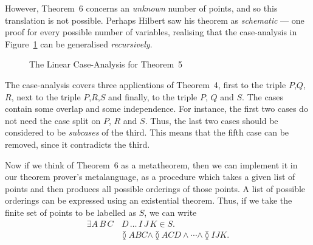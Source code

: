 However, Theorem~6 concerns an \emph{unknown} number of points, and so this translation is not possible. Perhaps Hilbert saw his theorem as \emph{schematic} --- one proof for every possible number of variables, realising that the case-analysis in Figure~\ref{fig:Theorem5Cases} can be generalised \emph{recursively}. 

\begin{figure}
\caption{The Linear Case-Analysis for Theorem~5}
\label{fig:Theorem5Cases}
\end{figure}

The case-analysis covers three applications of Theorem~4, first to the triple $P$,$Q$,$R$, next to the triple $P$,$R$,$S$ and finally, to the triple $P$, $Q$ and $S$. The cases contain some overlap and some independence. For instance, the first two cases do not need the case split on $P$, $R$ and $S$. Thus, the last two cases should be considered to be \emph{subcases} of the third. This means that the fifth case can be removed, since it contradicts the third.\label{sec:IgnoreCase5}

Now if we think of Theorem~6 as a metatheorem, then we can implement it in our theorem prover's metalanguage, as a procedure which takes a given list of points and then produces all possible orderings of those points. A list of possible orderings can be expressed using an existential theorem. Thus, if we take the finite set of points to be labelled as $S$, we can write
\begin{align*}\label{theorem:Theorem6Example}
\exists A\,B\,C&\,D\,\ldots\,I\,J\,K \in S.\tag{$\ddagger$}\\
                &\between{A}{B}{C} \wedge \between{A}{C}{D} \wedge \cdots \wedge \between{I}{J}{K}.                 
\end{align*}

